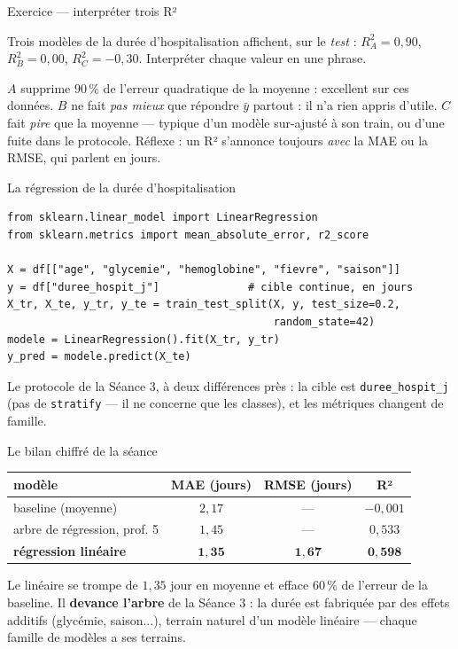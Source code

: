\documentclass[aspectratio=169,11pt]{beamer}
\begin{document}
\begin{frame}{Exercice — interpréter trois R²}
\begin{ucadrec}[Énoncé]
{\small Trois modèles de la durée d'hospitalisation affichent, sur le \emph{test} : $R^2_A = 0{,}90$, $R^2_B = 0{,}00$, $R^2_C = -0{,}30$. Interpréter chaque valeur en une phrase.}
\end{ucadrec}
\pause
\begin{ucadex}[Correction]
{\small $A$ supprime $90\,\%$ de l'erreur quadratique de la moyenne : excellent sur ces données. $B$ ne fait \emph{pas mieux} que répondre $\bar y$ partout : il n'a rien appris d'utile. $C$ fait \emph{pire} que la moyenne — typique d'un modèle sur-ajusté à son train, ou d'une fuite dans le protocole. Réflexe : un R² s'annonce toujours \emph{avec} la MAE ou la RMSE, qui parlent en jours.}
\end{ucadex}
\end{frame}

\begin{frame}[fragile]{La régression de la durée d'hospitalisation}
\begin{lstlisting}
from sklearn.linear_model import LinearRegression
from sklearn.metrics import mean_absolute_error, r2_score

X = df[["age", "glycemie", "hemoglobine", "fievre", "saison"]]
y = df["duree_hospit_j"]              # cible continue, en jours
X_tr, X_te, y_tr, y_te = train_test_split(X, y, test_size=0.2,
                                          random_state=42)
modele = LinearRegression().fit(X_tr, y_tr)
y_pred = modele.predict(X_te)
\end{lstlisting}
{\small Le protocole de la Séance 3, à deux différences près : la cible est \texttt{duree\_hospit\_j} (pas de \texttt{stratify} — il ne concerne que les classes), et les métriques changent de famille.}
\end{frame}

\begin{frame}{Le bilan chiffré de la séance}
\begin{ucadex}
{\small \begin{center}\renewcommand{\arraystretch}{1.1}\begin{tabular}{l|ccc}
modèle & MAE (jours) & RMSE (jours) & R²\\\hline
baseline (moyenne) & $2{,}17$ & — & $-0{,}001$\\
arbre de régression, prof. 5 & $1{,}45$ & — & $0{,}533$\\
\textbf{régression linéaire} & $\mathbf{1{,}35}$ & $\mathbf{1{,}67}$ & $\mathbf{0{,}598}$\\
\end{tabular}\end{center}
Le linéaire se trompe de $1{,}35$ jour en moyenne et efface $60\,\%$ de l'erreur de la baseline. Il \textbf{devance l'arbre} de la Séance 3 : la durée est fabriquée par des effets additifs (glycémie, saison...), terrain naturel d'un modèle linéaire — chaque famille de modèles a ses terrains.}
\end{ucadex}
\end{frame}
\end{document}
